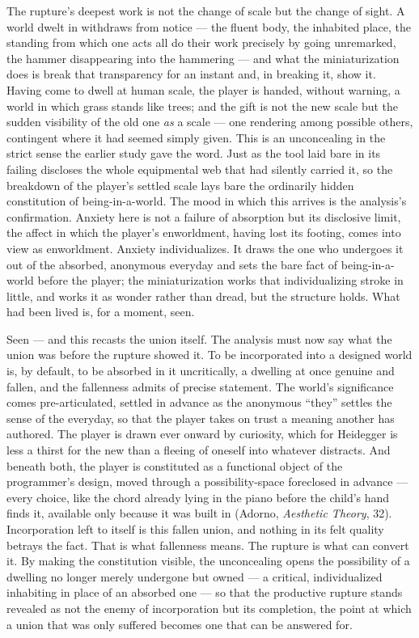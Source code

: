 The rupture's deepest work is not the change of scale but the change of sight. A world dwelt in withdraws from notice — the fluent body, the inhabited place, the standing from which one acts all do their work precisely by going unremarked, the hammer disappearing into the hammering — and what the miniaturization does is break that transparency for an instant and, in breaking it, show it. Having come to dwell at human scale, the player is handed, without warning, a world in which grass stands like trees; and the gift is not the new scale but the sudden visibility of the old one \textit{as} a scale — one rendering among possible others, contingent where it had seemed simply given. This is an unconcealing in the strict sense the earlier study gave the word. Just as the tool laid bare in its failing discloses the whole equipmental web that had silently carried it, so the breakdown of the player's settled scale lays bare the ordinarily hidden constitution of being-in-a-world. The mood in which this arrives is the analysis's confirmation. Anxiety here is not a failure of absorption but its disclosive limit, the affect in which the player's enworldment, having lost its footing, comes into view as enworldment. Anxiety individualizes. It draws the one who undergoes it out of the absorbed, anonymous everyday and sets the bare fact of being-in-a-world before the player; the miniaturization works that individualizing stroke in little, and works it as wonder rather than dread, but the structure holds. What had been lived is, for a moment, seen.

Seen — and this recasts the union itself. The analysis must now say what the union was before the rupture showed it. To be incorporated into a designed world is, by default, to be absorbed in it uncritically, a dwelling at once genuine and fallen, and the fallenness admits of precise statement. The world's significance comes pre-articulated, settled in advance as the anonymous ``they'' settles the sense of the everyday, so that the player takes on trust a meaning another has authored. The player is drawn ever onward by curiosity, which for Heidegger is less a thirst for the new than a fleeing of oneself into whatever distracts. And beneath both, the player is constituted as a functional object of the programmer's design, moved through a possibility-space foreclosed in advance — every choice, like the chord already lying in the piano before the child's hand finds it, available only because it was built in (Adorno, \textit{Aesthetic Theory}, 32). Incorporation left to itself is this fallen union, and nothing in its felt quality betrays the fact. That is what fallenness means. The rupture is what can convert it. By making the constitution visible, the unconcealing opens the possibility of a dwelling no longer merely undergone but owned — a critical, individualized inhabiting in place of an absorbed one — so that the productive rupture stands revealed as not the enemy of incorporation but its completion, the point at which a union that was only suffered becomes one that can be answered for.


